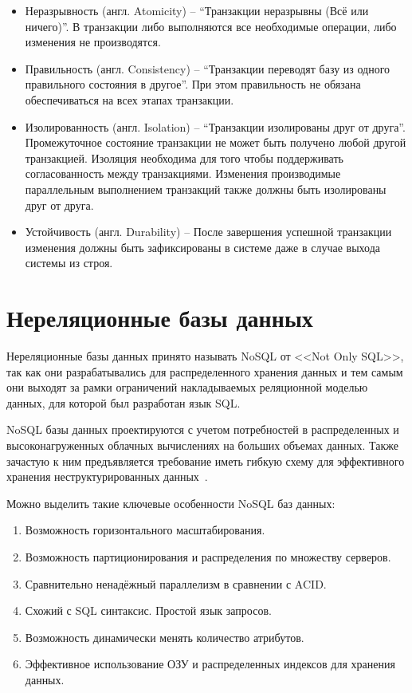 \begin{itemize}[label=---]
    \item Неразрывность (англ. Atomicity) -- ``Транзакции неразрывны (Всё или ничего)''.
    В транзакции либо выполняются все необходимые операции, либо изменения не производятся.

    \item Правильность (англ. Consistency) -- ``Транзакции переводят базу из одного правильного состояния в другое''.
    При этом правильность не обязана обеспечиваться на всех этапах транзакции. 
    
    \item Изолированность (англ. Isolation) -- ``Транзакции изолированы друг от друга''. 
    Промежуточное состояние транзакции не может быть получено любой другой транзакцией.
    Изоляция необходима для того чтобы поддерживать согласованность между транзакциями.
    Изменения производимые параллельным выполнением транзакций также должны быть изолированы друг от друга.

    \item Устойчивость (англ. Durability) -- После завершения успешной транзакции изменения должны быть зафиксированы в системе
    даже в случае выхода системы из строя.

\end{itemize}

\clearpage

\section{Нереляционные базы данных}
Нереляционные базы данных принято называть NoSQL от <<Not Only SQL>>,
так как они разрабатывались для распределенного хранения данных
и тем самым они выходят за рамки ограничений накладываемых реляционной моделью данных,
для которой был разработан язык SQL.

NoSQL базы данных проектируются с учетом потребностей в распределенных
и высоконагруженных облачных вычислениях на больших объемах данных.
Также зачастую к ним предъявляется требование иметь гибкую схему 
для эффективного хранения неструктурированных данных~\cite{nosqlusage}.  

Можно выделить такие ключевые особенности NoSQL баз данных:
\begin{enumerate}
    \item Возможность горизонтального масштабирования.
    \item Возможность партиционирования и распределения по множеству серверов.
    \item Сравнительно ненадёжный параллелизм в сравнении с ACID.
    \item Схожий с SQL синтаксис. Простой язык запросов.
    \item Возможность динамически менять количество атрибутов.
    \item Эффективное использование ОЗУ и распределенных индексов для хранения данных.
\end{enumerate}

